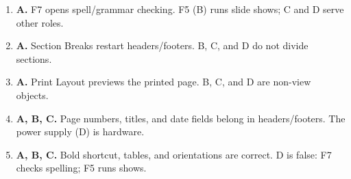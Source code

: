 \documentclass[11pt]{article}
\begin{document}
\begin{enumerate}[label=\textbf{Q\arabic*.}, leftmargin=*]
\item \textbf{A.} F7 opens spell/grammar checking. F5 (B) runs slide shows; C and D serve other roles.
\item \textbf{A.} Section Breaks restart headers/footers. B, C, and D do not divide sections.
\item \textbf{A.} Print Layout previews the printed page. B, C, and D are non-view objects.
\item \textbf{A, B, C.} Page numbers, titles, and date fields belong in headers/footers. The power supply (D) is hardware.
\item \textbf{A, B, C.} Bold shortcut, tables, and orientations are correct. D is false: F7 checks spelling; F5 runs shows.
\end{enumerate}
\def\JKSSBLessonID{23}\def\JKSSBAnswers{1}
\end{document}

